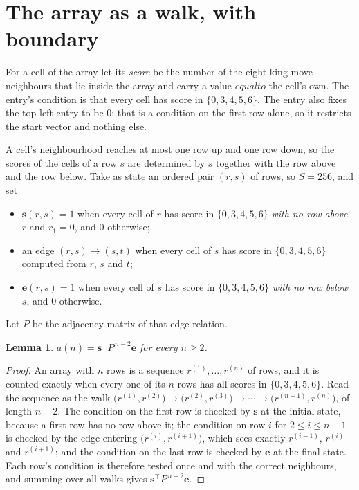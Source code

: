 \documentclass[11pt,a4paper]{article}
\theoremstyle{plain}
\newtheorem{lemma}[theorem]{Lemma}
\theoremstyle{definition}
\begin{document}
\section{The array as a walk, with boundary}

For a cell of the array let its \emph{score} be the number of the eight king-move neighbours that lie inside
the array and carry a value $equal to$ the cell's own. The entry's condition is that every cell
has score in $\{0,3,4,5,6\}$. The entry also fixes the top-left entry to be $0$; that is a condition on the first row alone, so it restricts the start vector and nothing else.

A cell's neighbourhood reaches at most one row up and one row down, so the scores of the
cells of a row $s$ are determined by $s$ together with the row above and the row below.
Take as state an ordered pair $(r,s)$ of rows, so $S=256$, and set
\begin{itemize}
\item $\mathbf{s}(r,s)=1$ when every cell of $r$ has score in $\{0,3,4,5,6\}$ \emph{with no row
above $r$} and $r_1=0$, and $0$ otherwise;
\item an edge $(r,s)\to(s,t)$ when every cell of $s$ has score in $\{0,3,4,5,6\}$ computed from
$r$, $s$ and $t$;
\item $\mathbf{e}(r,s)=1$ when every cell of $s$ has score in $\{0,3,4,5,6\}$ \emph{with no row
below $s$}, and $0$ otherwise.
\end{itemize}
Let $P$ be the adjacency matrix of that edge relation.

\begin{lemma}\label{lem:walk}
$a(n)=\mathbf{s}^{\!\top}P^{\,n-2}\mathbf{e}$ for every $n\ge2$.
\end{lemma}

\begin{proof}
An array with $n$ rows is a sequence $r^{(1)},\dots,r^{(n)}$ of rows, and it is counted
exactly when every one of its $n$ rows has all scores in $\{0,3,4,5,6\}$. Read the sequence as the
walk $\bigl(r^{(1)},r^{(2)}\bigr)\to\bigl(r^{(2)},r^{(3)}\bigr)\to\cdots\to
\bigl(r^{(n-1)},r^{(n)}\bigr)$, of length $n-2$. The condition on the first row is
checked by $\mathbf{s}$ at the initial state, because a first row has no row above it; the
condition on row $i$ for $2\le i\le n-1$ is checked by the edge entering
$\bigl(r^{(i)},r^{(i+1)}\bigr)$, which sees exactly $r^{(i-1)}$, $r^{(i)}$ and
$r^{(i+1)}$; and the condition on the last row is checked by $\mathbf{e}$ at the final
state. Each row's condition is therefore tested once and with the correct neighbours, and
summing over all walks gives $\mathbf{s}^{\!\top}P^{\,n-2}\mathbf{e}$.
\end{proof}
\end{document}
